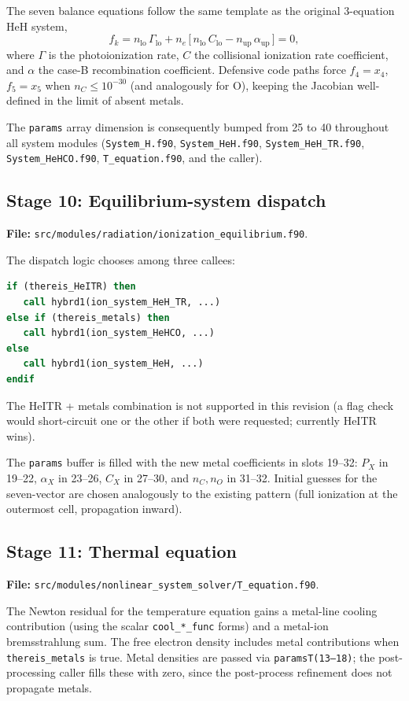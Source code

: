 \documentclass[english,a4paper]{my_memo}
\begin{document}
The seven balance equations follow the same template as the original
3-equation HeH system,
\[
  f_k = n_\mathrm{lo}\,\Gamma_\mathrm{lo}
      + n_e\,\bigl[\,n_\mathrm{lo}\,C_\mathrm{lo}
                  - n_\mathrm{up}\,\alpha_\mathrm{up}\,\bigr] = 0,
\]
where \(\Gamma\) is the photoionization rate, \(C\) the collisional
ionization rate coefficient, and \(\alpha\) the case-B recombination
coefficient.  Defensive code paths force \(f_{4} = x_{4}\),
\(f_{5} = x_{5}\) when \(n_C \le 10^{-30}\) (and analogously for O),
keeping the Jacobian well-defined in the limit of absent metals.

The \texttt{params} array dimension is consequently bumped from 25 to
40 throughout all system modules (\texttt{System\_H.f90},
\texttt{System\_HeH.f90}, \texttt{System\_HeH\_TR.f90},
\texttt{System\_HeHCO.f90}, \texttt{T\_equation.f90}, and the caller).

\subsection{Stage 10: Equilibrium-system dispatch}
\textbf{File:} \texttt{src/modules/radiation/ionization\_equilibrium.f90}.

The dispatch logic chooses among three callees:
\begin{lstlisting}[language=Fortran]
if (thereis_HeITR) then
   call hybrd1(ion_system_HeH_TR, ...)
else if (thereis_metals) then
   call hybrd1(ion_system_HeHCO, ...)
else
   call hybrd1(ion_system_HeH, ...)
endif
\end{lstlisting}
The HeITR + metals combination is not supported in this revision (a
flag check would short-circuit one or the other if both were
requested; currently HeITR wins).

The \texttt{params} buffer is filled with the new metal coefficients
in slots 19--32:
\(P_{X}\) in 19--22, \(\alpha_{X}\) in 23--26, \(C_{X}\) in 27--30,
and \(n_C, n_O\) in 31--32.  Initial guesses for the seven-vector are
chosen analogously to the existing pattern (full ionization at the
outermost cell, propagation inward).

\subsection{Stage 11: Thermal equation}
\textbf{File:} \texttt{src/modules/nonlinear\_system\_solver/T\_equation.f90}.

The Newton residual for the temperature equation gains a metal-line
cooling contribution (using the scalar \texttt{cool\_*\_func} forms)
and a metal-ion bremsstrahlung sum.  The free electron density
includes metal contributions when \texttt{thereis\_metals} is true.
Metal densities are passed via \texttt{paramsT(13--18)}; the
post-processing caller fills these with zero, since the post-process
refinement does not propagate metals.
\end{document}
